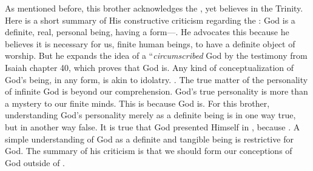 

As mentioned before, this brother acknowledges the , yet believes in the Trinity. Here is a short summary of His constructive criticism regarding the : God is a definite, real, personal being, having a form—. He advocates this because he believes it is necessary for us, finite human beings, to have a definite object of worship. But he expands the idea of a “\textit{circumscribed} God by the testimony from Isaiah chapter 40, which proves that God is. Any kind of conceptualization of God’s being, in any form, is akin to idolatry. . The true matter of the personality of infinite God is beyond our comprehension. God’s true personality is more than a mystery to our finite minds. This is because God is. For this brother, understanding God’s personality merely as a definite being is in one way true, but in another way false. It is true that God presented Himself in , because . A simple understanding of God as a definite and tangible being is restrictive for God. The summary of his criticism is that we should form our conceptions of God outside of .


